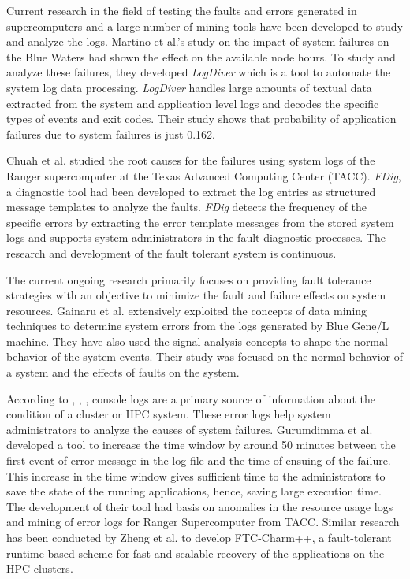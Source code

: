 \documentclass[10pt]{ruthesis}
\begin{document}
Current research in the field of testing the faults and errors generated in supercomputers and a large number of mining tools have been developed to study and analyze the logs. Martino et al.'s \cite{ref6} study on the impact of system failures on the Blue Waters had shown the effect on the available node hours. To study and analyze these failures, they developed \textit{LogDiver} which is a tool to automate the system log data processing. \textit{LogDiver} handles large amounts of textual data extracted from the system and application level logs and decodes the specific types of events and exit codes. Their study shows that probability of application failures due to system failures is just 0.162.

Chuah et al. \cite{ref9} studied the root causes for the failures using system logs of the Ranger supercomputer at the Texas Advanced Computing Center (TACC). \textit{FDig}, a diagnostic tool had been developed to extract the log entries as structured message templates to analyze the faults. \textit{FDig} detects the frequency of the specific errors by extracting the error template messages from the stored system logs and supports system administrators in the fault diagnostic processes. The research and development of the fault tolerant system is continuous. 

The current ongoing research primarily focuses on providing fault tolerance strategies with an objective to minimize the fault and failure effects on system resources. Gainaru et al. \cite{ref12} extensively exploited the concepts of data mining techniques to determine system errors from the logs generated by Blue Gene/L machine. They have also used the signal analysis concepts to shape the normal behavior of the system events. Their study was focused on the normal behavior of a system and the effects of faults on the system.

According to \cite{ref6}, \cite{ref9}, \cite{ref13}, console logs are a primary source of information about the condition of a cluster or HPC system. These error logs help system administrators to analyze the causes of system failures. Gurumdimma et al. \cite{ref13} developed a tool to increase the time window by around 50 minutes between the first event of error message in the log file and the time of ensuing of the failure. This increase in the time window gives sufficient time to the administrators to save the state of the running applications, hence, saving large execution time. The development of their tool had basis on anomalies in the resource usage logs and mining of error logs for Ranger Supercomputer from TACC. Similar research has been conducted by Zheng et al. \cite{ref15} to develop FTC-Charm++, a fault-tolerant runtime based scheme for fast and scalable recovery of the applications on the HPC clusters. 
\end{document}
